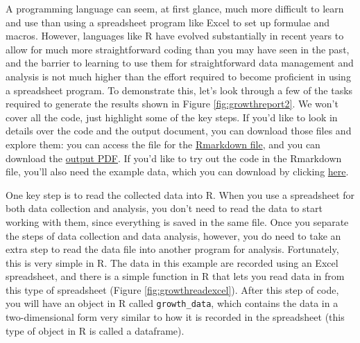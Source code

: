 \documentclass[]{tufte-book}
\begin{document}
A programming language can seem, at first glance, much more difficult to learn
and use than using a spreadsheet program like Excel to set up formulae and
macros. However, languages like R have evolved substantially in recent years to
allow for much more straightforward coding than you may have seen in the past,
and the barrier to learning to use them for straightforward data management and
analysis is not much higher than the effort required to become proficient in
using a spreadsheet program. To demonstrate this, let's look through a few of
the tasks required to generate the results shown in Figure
\ref{fig:growthreport2}. We won't cover all the code, just highlight some of
the key steps. If you'd like to look in details over the code and the output
document, you can download those files and explore them: you can access the file
for the \href{https://github.com/geanders/improve_repro/blob/master/data/growth_curve_data_in_excel\%20(1)/Example_report.Rmd}{Rmarkdown
file},
and you can download the \href{https://github.com/geanders/improve_repro/raw/master/data/growth_curve_data_in_excel\%20(1)/Example_report.pdf}{output
PDF}.
If you'd like to try out the code in the Rmarkdown file, you'll also need the
example data, which you can download by clicking
\href{https://github.com/geanders/improve_repro/raw/master/data/growth_curve_data_in_excel\%20(1)/growth\%20curve\%20data_GR.xls}{here}.

One key step is to read the collected data into R. When you use a spreadsheet
for both data collection and analysis, you don't need to read the data to start
working with them, since everything is saved in the same file. Once you separate
the steps of data collection and data analysis, however, you do need to take an
extra step to read the data file into another program for analysis. Fortunately,
this is very simple in R. The data in this example are recorded using an Excel
spreadsheet, and there is a simple function in R that lets you read data in from
this type of spreadsheet (Figure \ref{fig:growthreadexcel}). After this step of
code, you will have an object in R called \texttt{growth\_data}, which contains the data
in a two-dimensional form very similar to how it is recorded in the spreadsheet
(this type of object in R is called a dataframe).
\end{document}
